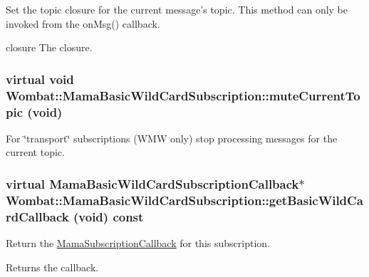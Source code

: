Set the topic closure for the current message's topic. This method can only be invoked from the onMsg() callback.

closure The closure. \hypertarget{classWombat_1_1MamaBasicWildCardSubscription_a7f2a0d630890db350db7dac440a07bc8}{
\subsubsection[{muteCurrentTopic}]{\setlength{\rightskip}{0pt plus 5cm}virtual void Wombat::MamaBasicWildCardSubscription::muteCurrentTopic (void)}}
\label{classWombat_1_1MamaBasicWildCardSubscription_a7f2a0d630890db350db7dac440a07bc8}


For \char`\"{}transport\char`\"{} subscriptions (WMW only) stop processing messages for the current topic. \hypertarget{classWombat_1_1MamaBasicWildCardSubscription_ae4735aabe82c2b92741aaf24ade99a46}{
\subsubsection[{getBasicWildCardCallback}]{\setlength{\rightskip}{0pt plus 5cm}virtual {\bf MamaBasicWildCardSubscriptionCallback}$\ast$ Wombat::MamaBasicWildCardSubscription::getBasicWildCardCallback (void) const}}
\label{classWombat_1_1MamaBasicWildCardSubscription_ae4735aabe82c2b92741aaf24ade99a46}


Return the {\ttfamily \hyperlink{classWombat_1_1MamaSubscriptionCallback}{MamaSubscriptionCallback}} for this subscription. \begin{DoxyReturn}{Returns}
the callback. 
\end{DoxyReturn}
